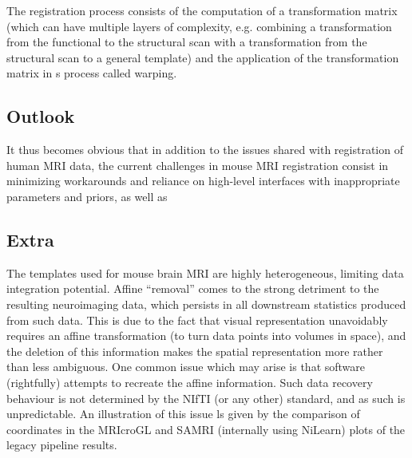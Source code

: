 The registration process consists of the computation of a transformation matrix (which can have multiple layers of complexity, e.g. combining a transformation from the functional to the structural scan with a transformation from the structural scan to a general template) and the application of the transformation matrix in s process called warping.

\subsection{Outlook}
It thus becomes obvious that in addition to the issues shared with registration of human MRI data, the current challenges in mouse MRI registration consist in minimizing workarounds and reliance on high-level interfaces with inappropriate parameters and priors, as well as 

	\subsection{Extra}
	The templates used for mouse brain MRI are highly heterogeneous, limiting data integration potential.
	Affine “removal” comes to the strong detriment to the resulting neuroimaging data, which persists in all downstream statistics produced from such data.
	This is due to the fact that visual representation unavoidably requires an affine transformation (to turn data points into volumes in space), and the deletion of this information makes the spatial representation more rather than less ambiguous.
	One common issue which may arise is that software (rightfully) attempts to recreate the affine information.
	Such data recovery behaviour is not determined by the NIfTI (or any other) standard, and as such is unpredictable.
	An illustration of this issue ls given by the comparison of coordinates in the MRIcroGL and SAMRI (internally using NiLearn) plots of the legacy pipeline results.
	
